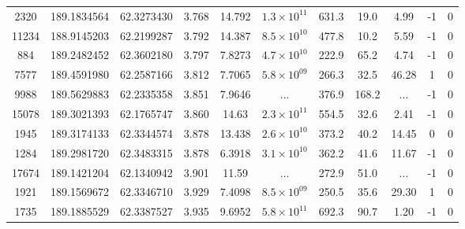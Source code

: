 \begin{table}
\begin{tabular}{ccccccccccc}
       2320 &                  189.1834564 &                 62.3273430 &          3.768 &           14.792 & $1.3\times10^{11}$ &          631.3 &        19.0 &        4.99 &               -1 &                  0 \\
      11234 &                  188.9145203 &                 62.2199287 &          3.792 &           14.387 & $8.5\times10^{10}$ &          477.8 &        10.2 &        5.59 &               -1 &                  0 \\
        884 &                  189.2482452 &                 62.3602180 &          3.797 &           7.8273 & $4.7\times10^{10}$ &          222.9 &        65.2 &        4.74 &               -1 &                  0 \\
       7577 &                  189.4591980 &                 62.2587166 &          3.812 &           7.7065 & $5.8\times10^{09}$ &          266.3 &        32.5 &       46.28 &                1 &                  0 \\
       9988 &                  189.5629883 &                 62.2335358 &          3.851 &           7.9646 &                ... &          376.9 &       168.2 &         ... &               -1 &                  0 \\
      15078 &                  189.3021393 &                 62.1765747 &          3.860 &            14.63 & $2.3\times10^{11}$ &          554.5 &        32.6 &        2.41 &               -1 &                  0 \\
       1945 &                  189.3174133 &                 62.3344574 &          3.878 &           13.438 & $2.6\times10^{10}$ &          373.2 &        40.2 &       14.45 &                0 &                  0 \\
       1284 &                  189.2981720 &                 62.3483315 &          3.878 &           6.3918 & $3.1\times10^{10}$ &          362.2 &        41.6 &       11.67 &               -1 &                  0 \\
      17674 &                  189.1421204 &                 62.1340942 &          3.901 &            11.59 &                ... &          272.9 &        51.0 &         ... &               -1 &                  0 \\
       1921 &                  189.1569672 &                 62.3346710 &          3.929 &           7.4098 & $8.5\times10^{09}$ &          250.5 &        35.6 &       29.30 &                1 &                  0 \\
       1735 &                  189.1885529 &                 62.3387527 &          3.935 &           9.6952 & $5.8\times10^{11}$ &          692.3 &        90.7 &        1.20 &               -1 &                  0 \\

\end{tabular}
\end{table}
